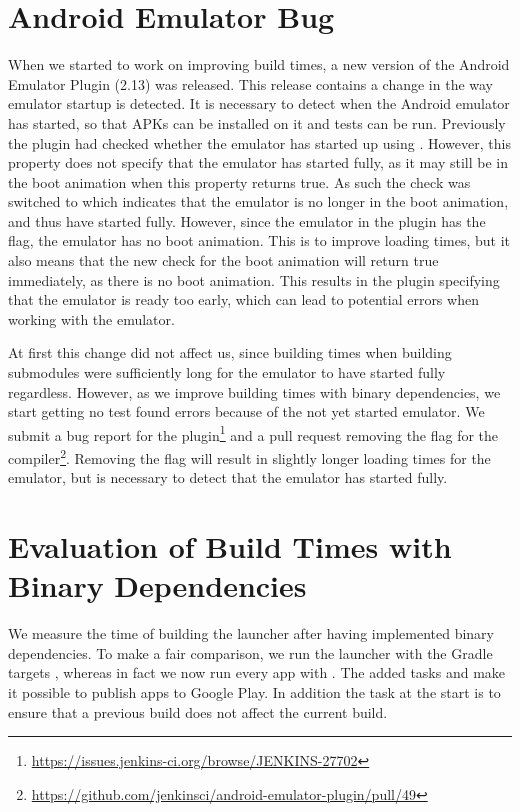 \section{Android Emulator Bug}\label{sec:emulator_bug}
When we started to work on improving build times, a new version of the Android Emulator Plugin (2.13) was released. This release contains a change in the way emulator startup is detected. It is necessary to detect when the Android emulator has started, so that APKs can be installed on it and tests can be run. Previously the plugin had checked whether the emulator has started up using . However, this property does not specify that the emulator has started fully, as it may still be in the boot animation when this property returns true. As such the check was switched to   which indicates that the emulator is no longer in the boot animation, and thus have started fully. However, since the emulator in the plugin has the  flag, the emulator has no boot animation. This is to improve loading times, but it also means that the new check for the boot animation will return true immediately, as there is no boot animation. This results in the plugin specifying that the emulator is ready too early, which can lead to potential errors when working with the emulator.

At first this change did not affect us, since building times when building submodules were sufficiently long for the emulator to have started fully regardless. However, as we improve building times with binary dependencies, we start getting no test found errors because of the not yet started emulator. We submit a bug report for the plugin\footnote{\url{https://issues.jenkins-ci.org/browse/JENKINS-27702}} and a pull request removing the  flag for the compiler\footnote{\url{https://github.com/jenkinsci/android-emulator-plugin/pull/49}}. Removing the  flag will result in slightly longer loading times for the emulator, but is necessary to detect that the emulator has started fully.

\section{Evaluation of Build Times with Binary Dependencies}\label{sec:faster_build_evaluation}
We measure the time of building the launcher after having implemented binary dependencies. To make a fair comparison, we run the launcher with the Gradle targets , whereas in fact we now run every app with . The added tasks  and  make it possible to publish apps to Google Play. In addition the  task at the start is to ensure that a previous build does not affect the current build.

